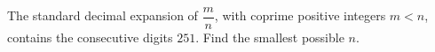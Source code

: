 The standard decimal expansion of $\dfrac{m}{n}$, with coprime positive integers $m<n$, contains the consecutive digits $251$. Find the smallest possible $n$.
